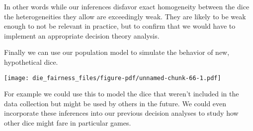 \documentclass[
  letterpaper,
  DIV=11,
  numbers=noendperiod]{scrartcl}
\newenvironment{Shaded}{\begin{snugshade}}{\end{snugshade}}
\newcommand{\AttributeTok}[1]{\textcolor[rgb]{0.40,0.45,0.13}{#1}}
\newcommand{\ControlFlowTok}[1]{\textcolor[rgb]{0.00,0.23,0.31}{#1}}
\newcommand{\DecValTok}[1]{\textcolor[rgb]{0.68,0.00,0.00}{#1}}
\newcommand{\FloatTok}[1]{\textcolor[rgb]{0.68,0.00,0.00}{#1}}
\newcommand{\FunctionTok}[1]{\textcolor[rgb]{0.28,0.35,0.67}{#1}}
\newcommand{\NormalTok}[1]{\textcolor[rgb]{0.00,0.23,0.31}{#1}}
\newcommand{\OtherTok}[1]{\textcolor[rgb]{0.00,0.23,0.31}{#1}}
\newcommand{\SpecialCharTok}[1]{\textcolor[rgb]{0.37,0.37,0.37}{#1}}
\newcommand{\StringTok}[1]{\textcolor[rgb]{0.13,0.47,0.30}{#1}}
\begin{document}
In other words while our inferences disfavor exact homogeneity between
the dice the heterogeneities they allow are exceedingly weak. They are
likely to be weak enough to not be relevant in practice, but to confirm
that we would have to implement an appropriate decision theory analysis.

Finally we can use our population model to simulate the behavior of new,
hypothetical dice.

\begin{Shaded}
\end{Shaded}

\texttt{[image: die\_fairness\_files/figure-pdf/unnamed-chunk-66-1.pdf]}

For example we could use this to model the dice that weren't included in
the data collection but might be used by others in the future. We could
even incorporate these inferences into our previous decision analyses to
study how other dice might fare in particular games.
\end{document}
